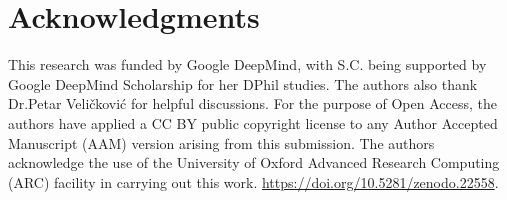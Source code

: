 \documentclass[lettersize,journal]{IEEEtran}
\begin{document}
\section{Acknowledgments}
This research was funded by Google DeepMind, with S.C. being supported by Google DeepMind Scholarship for her DPhil studies. The authors also thank Dr.Petar Veličković for helpful discussions. For the purpose of Open Access, the authors have applied a CC BY public copyright license to any Author Accepted Manuscript (AAM) version arising from this submission. The authors acknowledge the use of the University of Oxford Advanced Research Computing (ARC) facility in carrying out this work. \href{https://doi.org/10.5281/zenodo.22558}{https://doi.org/10.5281/zenodo.22558}.





\end{document}
